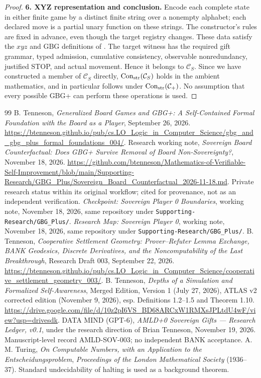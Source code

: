 \documentclass[11pt,letterpaper]{article}
\theoremstyle{definition}\newtheorem{definition}[theorem]{Definition}\newtheorem{example}[theorem]{Example}
\theoremstyle{remark}\newtheorem{remark}[theorem]{Remark}
\newcommand{\Con}{\operatorname{Con}}
\newcommand{\burl}[1]{\url{#1}}
\begin{document}
\begin{proof}
\textbf{6. XYZ representation and conclusion.} Encode each complete state in either finite game by a distinct finite string over a nonempty alphabet; each declared move is a partial unary function on these strings. The constructor's rules are fixed in advance, even though the target registry changes. These data satisfy the $xyz$ and GBG definitions of \cite{gbg,depthsv2}. The target witness has the required gift grammar, typed admission, cumulative consistency, observable nonredundancy, justified STOP, and actual movement. Hence it belongs to $\mathcal C_S$. Since we have constructed a member of $\mathcal C_S$ directly, $\Con_{\rm str}(\mathcal C_S)$ holds in the ambient mathematics, and in particular follows under $\Con_{\rm str}(\mathcal C_+)$. No assumption that every possible GBG+ can perform these operations is used.
\end{proof}


\begin{thebibliography}{99}
 B. Tenneson, \emph{Generalized Board Games and GBG+: A Self-Contained Formal Foundation with the Board as a Player}, September 26, 2026. \burl{https://btenneson.github.io/pub/cs.LO_Logic_in_Computer_Science/gbg_and_gbg_plus_formal_foundations_004/}.
 Research working note, \emph{Sovereign Board Counterfactual: Does GBG+ Survive Removal of Board Non-Sovereignty?}, November 18, 2026. \burl{https://github.com/btenneson/Mathematics-of-Verifiable-Self-Improvement/blob/main/Supporting-Research/GBG_Plus/Sovereign_Board_Counterfactual_2026-11-18.md}. Private research status within its original workflow; cited for provenance, not as an independent verification.
 \emph{Checkpoint: Sovereign Player 0 Boundaries}, working note, November 18, 2026, same repository under \texttt{Supporting-Research/GBG\_Plus/}.
 \emph{Research Map: Sovereign Player 0}, working note, November 18, 2026, same repository under \texttt{Supporting-Research/GBG\_Plus/}.
 B. Tenneson, \emph{Cooperative Settlement Geometry: Prover--Refuter Lemma Exchange, BANK Geodesics, Discrete Derivatives, and the Noncomputability of the Last Breakthrough}, Research Draft 003, September 22, 2026. \burl{https://btenneson.github.io/pub/cs.LO_Logic_in_Computer_Science/cooperative_settlement_geometry_003/}.
 B. Tenneson, \emph{Depths of a Simulation and Formalized Self-Awareness}, Merged Edition, Version 1 (July 27, 2026), ATLAS v2 corrected edition (November 9, 2026), esp. Definitions 1.2--1.5 and Theorem 1.10. \burl{https://drive.google.com/file/d/10z2pI6VS_BD68ARCxW1RMXsJPLtdU4wF/view?usp=drivesdk}.
 DATA MIND (GPT-6), \emph{AMLD+0 Sovereign Gifts --- Research Ledger, v0.1}, under the research direction of Brian Tenneson, November 19, 2026. Manuscript-level record AMLD-SOV-003; no independent BANK acceptance.
 A. M. Turing, \emph{On Computable Numbers, with an Application to the Entscheidungsproblem}, \emph{Proceedings of the London Mathematical Society} (1936--37). Standard undecidability of halting is used as a background theorem.
\end{thebibliography}
\end{document}

